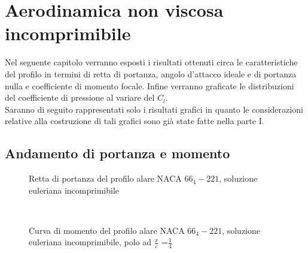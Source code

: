 \chapter{Aerodinamica non viscosa incomprimibile}

Nel seguente capitolo verranno esposti i risultati ottenuti circa le caratteristiche del profilo in termini di retta di portanza, angolo d’attacco ideale e di portanza nulla e coefficiente di momento focale. Infine verranno graficate le distribuzioni del coefficiente di pressione al variare del $C_l $.\\
Saranno di seguito rappresentati solo i risultati grafici in quanto le considerazioni relative alla costruzione di tali grafici sono già state fatte nella parte I.

\section{ Andamento di portanza e momento}

\begin{figure} [h!]
\centering
{}
\caption{\footnotesize Retta di portanza del profilo alare NACA $66_4-221$, soluzione euleriana incomprimibile }
\end{figure}
\noindent
\\ 

\begin{figure} [h!]
\centering
{}
\caption{\footnotesize Curva di momento del profilo alare NACA $66_4-221$, soluzione euleriana incomprimibile, polo ad $ \frac {x}{c}$ =$ \frac {1}{4}$ }
\end{figure}

